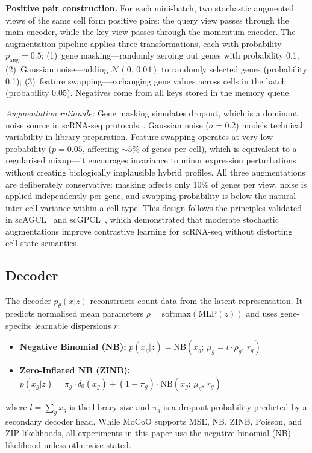 \documentclass[preprint,12pt,number]{elsarticle}
\begin{document}
\textbf{Positive pair construction.} For each mini-batch, two stochastic augmented views of the same cell form positive pairs: the query view passes through the main encoder, while the key view passes through the momentum encoder. The augmentation pipeline applies three transformations, each with probability $p_{\mathrm{aug}}{=}0.5$: (1)~gene masking---randomly zeroing out genes with probability 0.1; (2)~Gaussian noise---adding $\mathcal{N}(0,\,0.04)$ to randomly selected genes (probability 0.1); (3)~feature swapping---exchanging gene values across cells in the batch (probability 0.05). Negatives come from all keys stored in the memory queue.

\textit{Augmentation rationale:} Gene masking simulates dropout, which is a dominant noise source in scRNA-seq protocols~\cite{hicks2018missing}. Gaussian noise ($\sigma{=}0.2$) models technical variability in library preparation. Feature swapping operates at very low probability ($p{=}0.05$, affecting ${\sim}5\%$ of genes per cell), which is equivalent to a regularised mixup---it encourages invariance to minor expression perturbations without creating biologically implausible hybrid profiles. All three augmentations are deliberately conservative: masking affects only 10\% of genes per view, noise is applied independently per gene, and swapping probability is below the natural inter-cell variance within a cell type. This design follows the principles validated in scAGCL~\cite{cai2024scagcl} and scGPCL~\cite{cai2024scgpcl}, which demonstrated that moderate stochastic augmentations improve contrastive learning for scRNA-seq without distorting cell-state semantics.

\subsection{Decoder}
\label{sec:method:decoder}

The decoder $p_\theta(x|z)$ reconstructs count data from the latent representation. It predicts normalised mean parameters $\rho = \mathrm{softmax}(\mathrm{MLP}(z))$ and uses gene-specific learnable dispersions $r$:
\begin{itemize}
    \item \textbf{Negative Binomial (NB):} $p(x_g | z) = \mathrm{NB}(x_g;\, \mu_g = l \cdot \rho_g,\, r_g)$
    \item \textbf{Zero-Inflated NB (ZINB):} $p(x_g | z) = \pi_g \cdot \delta_0(x_g) + (1 - \pi_g) \cdot \mathrm{NB}(x_g;\, \mu_g,\, r_g)$
\end{itemize}
where $l = \sum_g x_g$ is the library size and $\pi_g$ is a dropout probability predicted by a secondary decoder head. While MoCoO supports MSE, NB, ZINB, Poisson, and ZIP likelihoods, all experiments in this paper use the negative binomial (NB) likelihood unless otherwise stated.
\end{document}

